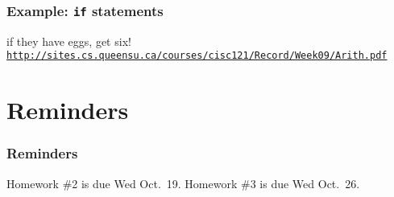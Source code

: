 \documentclass[11pt]{beamer}
\begin{document}
\begin{frame}[fragile]
  \frametitle{Example:  \texttt{if} statements}
  \Enlarge
  if they have eggs, get six!\\
  \textcolor{blue}{\small \texttt{\url{http://sites.cs.queensu.ca/courses/cisc121/Record/Week09/Arith.pdf}}}
\end{frame}


\section{Reminders}

\begin{frame}
  \frametitle{Reminders}
  \Enlarge

  \begin{itemize}
  \myitem  Homework \#2 is due Wed Oct.\ 19.
  \myitem  Homework \#3 is due Wed Oct.\ 26.
  \end{itemize}
\end{frame}
\end{document}
